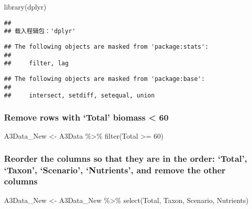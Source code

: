 \documentclass[
]{article}
\newenvironment{Shaded}{\begin{snugshade}}{\end{snugshade}}
\newcommand{\DecValTok}[1]{\textcolor[rgb]{0.00,0.00,0.81}{#1}}
\newcommand{\FunctionTok}[1]{\textcolor[rgb]{0.00,0.00,0.00}{#1}}
\newcommand{\NormalTok}[1]{#1}
\newcommand{\OtherTok}[1]{\textcolor[rgb]{0.56,0.35,0.01}{#1}}
\newcommand{\SpecialCharTok}[1]{\textcolor[rgb]{0.00,0.00,0.00}{#1}}
\begin{document}
\begin{Shaded}
\begin{Highlighting}[]
\FunctionTok{library}\NormalTok{(dplyr)}
\end{Highlighting}
\end{Shaded}

\begin{verbatim}
## 
## 载入程辑包：'dplyr'
\end{verbatim}

\begin{verbatim}
## The following objects are masked from 'package:stats':
## 
##     filter, lag
\end{verbatim}

\begin{verbatim}
## The following objects are masked from 'package:base':
## 
##     intersect, setdiff, setequal, union
\end{verbatim}

\hypertarget{remove-rows-with-total-biomass-60}{%
\subsubsection{Remove rows with `Total' biomass \textless{}
60}\label{remove-rows-with-total-biomass-60}}

\begin{Shaded}
\begin{Highlighting}[]
\NormalTok{A3Data\_New }\OtherTok{\textless{}{-}}\NormalTok{ A3Data }\SpecialCharTok{\%\textgreater{}\%}
  \FunctionTok{filter}\NormalTok{(Total }\SpecialCharTok{\textgreater{}=} \DecValTok{60}\NormalTok{)}
\end{Highlighting}
\end{Shaded}

\hypertarget{reorder-the-columns-so-that-they-are-in-the-order-total-taxon-scenario-nutrients-and-remove-the-other-columns}{%
\subsubsection{Reorder the columns so that they are in the order:
`Total', `Taxon', `Scenario', `Nutrients', and remove the other
columns}\label{reorder-the-columns-so-that-they-are-in-the-order-total-taxon-scenario-nutrients-and-remove-the-other-columns}}

\begin{Shaded}
\begin{Highlighting}[]
\NormalTok{A3Data\_New }\OtherTok{\textless{}{-}}\NormalTok{ A3Data\_New }\SpecialCharTok{\%\textgreater{}\%} 
  \FunctionTok{select}\NormalTok{(Total, Taxon, Scenario, Nutrients)}
\end{Highlighting}
\end{Shaded}
\end{document}
